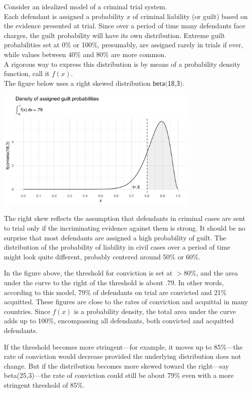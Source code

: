 \documentclass[10pt,dvipsnames]{scrartcl}
\begin{document}
Consider an idealized model of a criminal trial system.\\
Each defendant is assigned a probability \(x\) of criminal liability (or
guilt) based on the evidence presented at trial. Since over a period of
time many defendants face charges, the guilt probability will have its
own distribution. Extreme guilt probabilities set at 0\% or 100\%,
presumably, are assigned rarely in trials if ever, while values between
40\% and 80\% are more common.\\
A rigorous way to express this distribution is by means of a probability
density function, call it \(f(x)\).\\
The figure below uses a right skewed distribution
\(\textsf{beta(18,3)}\).

\begin{center}
    \includegraphics[width=10cm]{beta(18,3)2.png}
\end{center}

\noindent The right skew reflects the assumption that defendants in
criminal cases are sent to trial only if the incriminating evidence
against them is strong. It should be no surprise that most defendants
are assigned a high probability of guilt. The distribution of the
probability of liability in civil cases over a period of time might look
quite different, probably centered around 50\% or 60\%.

In the figure above, the threshold for conviction is set at \(>80\%\),
and the area under the curve to the right of the threshold is about
\(.79\). In other words, according to this model, 79\% of defendants on
trial are convicted and 21\% acquitted. These figures are close to the
rates of conviction and acquittal in many countries. Since \(f(x)\) is a
probability density, the total area under the curve adds up to 100\%,
encompassing all defendants, both convicted and acquitted defendants.

If the threshold becomes more stringent---for example, it moves up to
85\%---the rate of conviction would decrease provided the underlying
distribution does not change. But if the distribution becomes more
skewed toward the right---say \textsf{beta(25,3)}---the rate of
conviction could still be about 79\% even with a more stringent
threshold of 85\%.
\end{document}
